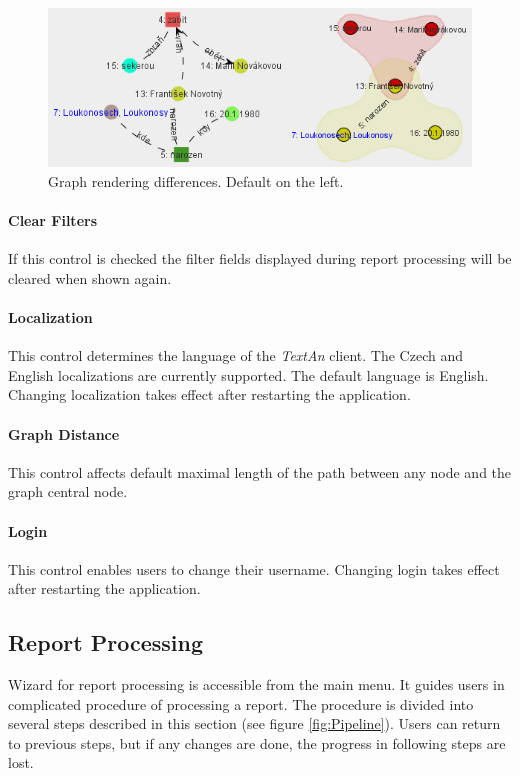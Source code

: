 \documentclass[12pt,a4paper]{report}
\newcommand{\textan}{\emph{TextAn}}
\begin{document}
\begin{figure}[!htb]
        \centering
        \includegraphics[width=\textwidth]{Images/hypergraphs}
        \caption{Graph rendering differences. Default on the left.}
        \label{fig:Hypergraphs}
\end{figure}

\paragraph{Clear Filters} If this control is checked the filter fields
displayed during report processing will be cleared when shown again.

\paragraph{Localization} This control determines the language of the \textan{}
client. The Czech and English localizations are currently supported. The
default language is English. Changing localization takes effect after
restarting the application.

\paragraph{Graph Distance} This control affects default maximal length of the
path between any node and the graph central node.

\paragraph{Login} This control enables users to change their username. Changing
login takes effect after restarting the application.

\subsection{Report Processing}
\label{ssec:ProcessReport}

Wizard for report processing is accessible from the main menu. It guides
users in complicated procedure of processing a report. The procedure is divided
into several steps described in this section (see figure \ref{fig:Pipeline}).
Users can return to previous steps, but if any changes are done, the progress
in following steps are lost.
\end{document}
